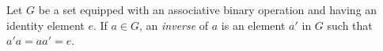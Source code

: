 Let $G$ be a set equipped with an associative binary operation and having an identity element $e$. If $a \in G$, an \textit{inverse} of $a$ is an element $a'$ in $G$ such that $a'a = aa' = e$.
